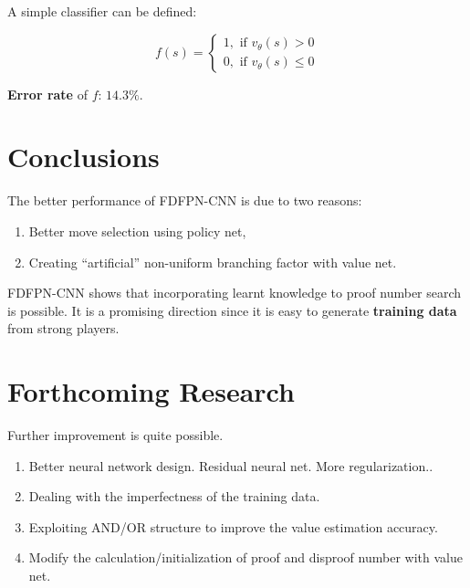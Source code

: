 \documentclass[a0,portrait]{a0poster}
\begin{document}
\begin{multicols}{3}
A simple classifier can be defined:

$$f(s) = \begin{cases}
1, \mbox{ if } v_\theta(s) > 0 \\
0, \mbox{ if } v_\theta(s) \leq 0  
\end{cases}
$$


\textbf{Error rate} of $f$: $14.3\%$. 


\color{SaddleBrown} %

\section*{Conclusions}
The better performance of FDFPN-CNN is due to two reasons:

\begin{enumerate}
\item Better move selection using policy net,
\item Creating ``artificial'' non-uniform branching factor with value net.
\end{enumerate}

FDFPN-CNN shows that incorporating learnt knowledge to proof number search is possible. 
It is a promising direction since it is easy to generate \textbf{training data} from strong players.
 
\color{Black} %


\section*{Forthcoming Research}

Further improvement is quite possible. 
\begin{enumerate}
	\item Better neural network design. Residual neural net. More regularization..
	\item Dealing with the imperfectness of the training data. 
	\item Exploiting AND/OR structure to improve the value estimation accuracy. 
	\item Modify the calculation/initialization of proof and disproof number with value net.
\end{enumerate}


\end{multicols}
\end{document}
